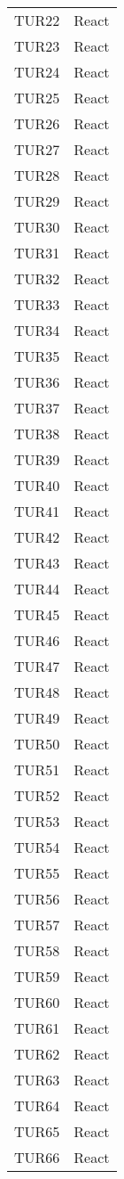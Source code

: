\documentclass[PianoDiQualifica.tex]{subfiles}
\begin{document}
\begin{longtable}[H]{P{5cm}P{9cm}}
	TUR22 & React \\ 
	TUR23 & React \\ 
	TUR24 & React \\ 
	TUR25 & React \\ 
	TUR26 & React \\ 
	TUR27 & React \\ 
	TUR28 & React \\ 
	TUR29 & React \\ 
	TUR30 & React \\ 
	TUR31 & React \\ 
	TUR32 & React \\ 
	TUR33 & React \\ 
	TUR34 & React \\ 
	TUR35 & React \\ 
	TUR36 & React \\ 
	TUR37 & React \\ 
	TUR38 & React \\ 
	TUR39 & React \\ 
	TUR40 & React \\ 
	TUR41 & React \\ 
	TUR42 & React \\ 
	TUR43 & React \\ 
	TUR44 & React \\ 
	TUR45 & React \\ 
	TUR46 & React \\ 
	TUR47 & React \\ 
	TUR48 & React \\ 
	TUR49 & React \\ 
	TUR50 & React \\ 
	TUR51 & React \\ 
	TUR52 & React \\ 
	TUR53 & React \\ 
	TUR54 & React \\ 
	TUR55 & React \\ 
	TUR56 & React \\ 
	TUR57 & React \\ 
	TUR58 & React \\ 
	TUR59 & React \\ 
	TUR60 & React \\ 
	TUR61 & React \\ 
	TUR62 & React \\ 
	TUR63 & React \\ 
	TUR64 & React \\ 
	TUR65 & React \\ 
	TUR66 & React \\ 

\end{longtable}
\end{document}
